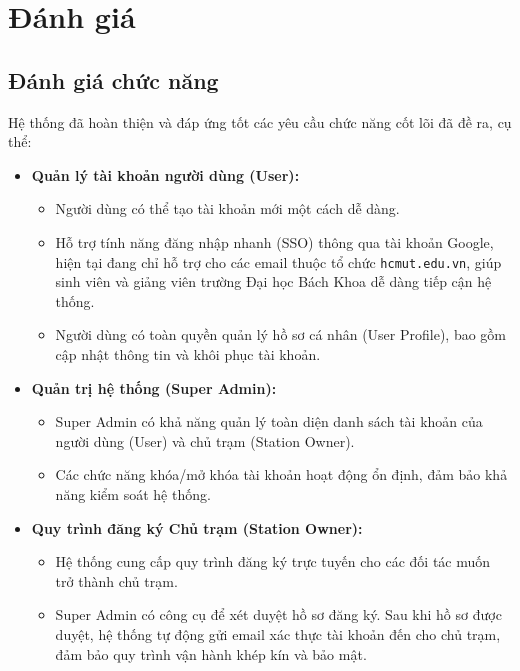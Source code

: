\section{Đánh giá}

\subsection{Đánh giá chức năng}
Hệ thống đã hoàn thiện và đáp ứng tốt các yêu cầu chức năng cốt lõi đã đề ra, cụ thể:

\begin{itemize}
    \item \textbf{Quản lý tài khoản người dùng (User):}
    \begin{itemize}
        \item Người dùng có thể tạo tài khoản mới một cách dễ dàng.
        \item Hỗ trợ tính năng đăng nhập nhanh (SSO) thông qua tài khoản Google, hiện tại đang chỉ hỗ trợ cho các email thuộc tổ chức \texttt{hcmut.edu.vn}, giúp sinh viên và giảng viên trường Đại học Bách Khoa dễ dàng tiếp cận hệ thống.
        \item Người dùng có toàn quyền quản lý hồ sơ cá nhân (User Profile), bao gồm cập nhật thông tin và khôi phục tài khoản.
    \end{itemize}

    \item \textbf{Quản trị hệ thống (Super Admin):}
    \begin{itemize}
        \item Super Admin có khả năng quản lý toàn diện danh sách tài khoản của người dùng (User) và chủ trạm (Station Owner).
        \item Các chức năng khóa/mở khóa tài khoản hoạt động ổn định, đảm bảo khả năng kiểm soát hệ thống.
    \end{itemize}

    \item \textbf{Quy trình đăng ký Chủ trạm (Station Owner):}
    \begin{itemize}
        \item Hệ thống cung cấp quy trình đăng ký trực tuyến cho các đối tác muốn trở thành chủ trạm.
        \item Super Admin có công cụ để xét duyệt hồ sơ đăng ký. Sau khi hồ sơ được duyệt, hệ thống tự động gửi email xác thực tài khoản đến cho chủ trạm, đảm bảo quy trình vận hành khép kín và bảo mật.
    \end{itemize}
\end{itemize}

